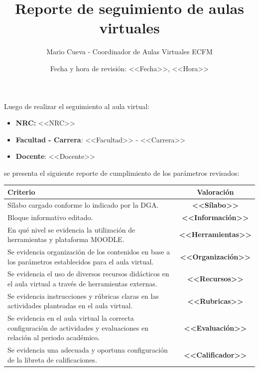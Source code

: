 \documentclass[11pt,a4paper]{article}
\title{\vspace{-2cm}\textbf{Reporte de seguimiento de aulas virtuales}}
\author{Mario Cueva - Coordinador de Aulas Virtuales ECFM}
\date{Fecha y hora de revisión: <<Fecha>>, <<Hora>>}
\begin{document}
\maketitle

\noindent
Luego de realizar el seguimiento al aula virtual:
\begin{itemize}
\item 
    \textbf{NRC:} <<NRC>>
\item 
    \textbf{Facultad - Carrera}: <<Facultad>> - <<Carrera>>
\item 
    \textbf{Docente}: <<Docente>>
\end{itemize}
\noindent
se presenta el siguiente reporte de cumplimiento de los parámetros revisados:
\begin{center} \small
\begin{tabular}{@{}L{11cm}c@{}}
\toprule
    \textbf{Criterio} & \textbf{Valoración}\\
\midrule
    Sílabo cargado conforme lo indicado por la DGA.  & \textbf{<<Sílabo>>} \\[5mm]
    Bloque informativo editado.  & \textbf{<<Información>>} \\[5mm]
    En qué nivel se evidencia la utilización de herramientas y plataforma MOODLE.  & \textbf{<<Herramientas>>} \\[5mm]
    Se evidencia organización de los contenidos en base a los parámetros establecidos para el aula virtual.  & \textbf{<<Organización>>} \\[5mm]
    Se evidencia el uso de diversos recursos didácticos en el aula virtual a través de herramientas externas.  & \textbf{<<Recursos>>} \\[5mm]
    Se evidencia instrucciones y rúbricas claras en las actividades planteadas en el aula virtual. & \textbf{<<Rubricas>>} \\[5mm]
    Se evidencia en el aula virtual la correcta configuración de actividades y evaluaciones en relación al periodo académico. & \textbf{<<Evaluación>>} \\[5mm]
    Se evidencia una adecuada y oportuna configuración de la libreta de calificaciones. & \textbf{<<Calificador>>} \\
\bottomrule
\end{tabular}
\end{center}
\end{document}

